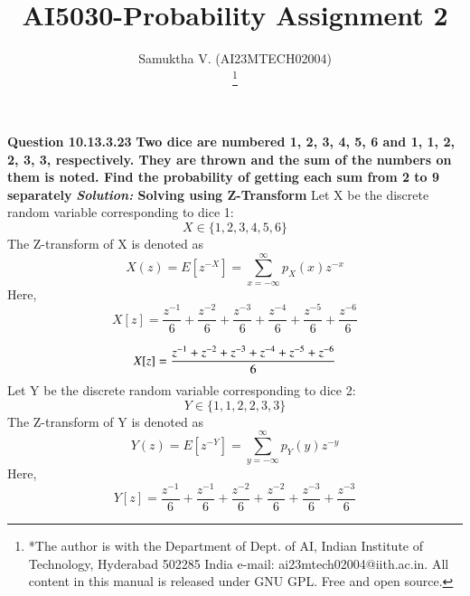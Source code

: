 \documentclass[journal,12pt,twocolumn]{IEEEtran}
\begin{document}
\vspace{3cm}

\title{
AI5030-Probability Assignment 2
}
\author{ Samuktha V. (AI23MTECH02004)

	\thanks{*The author is with the Department
		of Dept. of AI, Indian Institute of Technology, Hyderabad
		502285 India e-mail:  ai23mtech02004@iith.ac.in. All content in this manual is released under GNU GPL.  Free and open source.}
}

\maketitle

\newpage


\textbf{Question 10.13.3.23 }
\newline
\textbf{Two dice are numbered 1, 2, 3, 4, 5, 6 and 1, 1, 2, 2, 3, 3, respectively. They are
thrown and the sum of the numbers on them is noted. Find the probability of getting
each sum from 2 to 9 separately }
\newline
\newline
\textbf{\emph{Solution:} Solving using Z-Transform}
\newline
\newline
{ Let X be the discrete random variable corresponding to dice 1: \[ X \in \{1,2,3,4,5,6\} \]}
The Z-transform of X is denoted as \[X(z)=E[z^{-X}]=\sum_{x=-\infty}^{\infty} p_X(x) z^{-x}\]
\newline
Here,
\[X[z] = \frac{z^{-1}}{6} + \frac{z^{-2}}{6} + \frac{z^{-3}}{6} + \frac{z^{-4}}{6} + \frac{z^{-5}}{6} + \frac{z^{-6}}{6}  \]

\begin{equation}
\boldmath{X[z]=\frac{z^{-1}+z^{-2}+z^{-3}+ z^{-4}+ z^{-5} + z^{-6}}{6}}
\end{equation}
\newline
{ Let Y be the discrete random variable corresponding to dice 2: \[ Y \in \{1,1,2,2,3,3\} \]}
The Z-transform of Y is denoted as \[Y(z)=E[z^{-Y}]=\sum_{y=-\infty}^{\infty} p_Y(y) z^{-y}\]
\newline
Here,
\[Y[z] = \frac{z^{-1}}{6} + \frac{z^{-1}}{6} + \frac{z^{-2}}{6} + \frac{z^{-2}}{6} + \frac{z^{-3}}{6} + \frac{z^{-3}}{6}  \]
\end{document}
